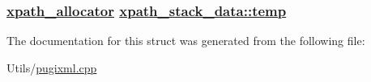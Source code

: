 \hypertarget{structxpath__stack__data_56e6bb486d52f4c5c2d02370e1b41058}{
\subsubsection[temp]{\setlength{\rightskip}{0pt plus 5cm}\hyperlink{classxpath__allocator}{xpath\_\-allocator} \hyperlink{structxpath__stack__data_56e6bb486d52f4c5c2d02370e1b41058}{xpath\_\-stack\_\-data::temp}}}
\label{structxpath__stack__data_56e6bb486d52f4c5c2d02370e1b41058}




The documentation for this struct was generated from the following file:\begin{CompactItemize}
\item 
Utils/\hyperlink{pugixml_8cpp}{pugixml.cpp}\end{CompactItemize}
